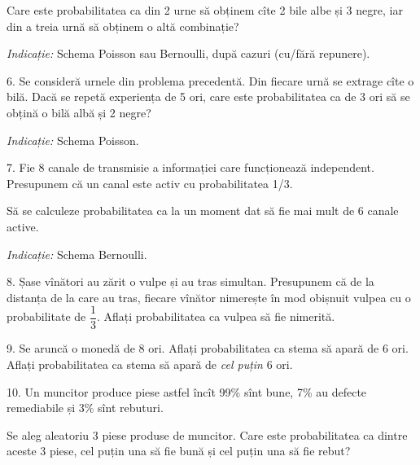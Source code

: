 Care este probabilitatea ca din 2 urne să obținem cîte 2 bile albe și 3 negre,
iar din a treia urnă să obținem o altă combinație?

\emph{Indicație:} Schema Poisson sau Bernoulli, după cazuri (cu/fără repunere).

\vspace{0.3cm}

6. Se consideră urnele din problema precedentă. Din fiecare urnă se extrage
cîte o bilă. Dacă se repetă experiența de 5 ori, care este probabilitatea ca
de 3 ori să se obțină o bilă albă și 2 negre?

\emph{Indicație:} Schema Poisson.

\vspace{0.3cm}

7. Fie 8 canale de transmisie a informației care funcționează independent.
Presupunem că un canal este activ cu probabilitatea 1/3.

Să se calculeze probabilitatea ca la un moment dat să fie mai mult de 6 canale
active.

\emph{Indicație:} Schema Bernoulli.

\vspace{0.3cm}

8. Șase vînători au zărit o vulpe și au tras simultan. Presupunem că de la
distanța de la care au tras, fiecare vînător nimerește în mod obișnuit vulpea
cu o probabilitate de $ \dfrac{1}{3} $. Aflați probabilitatea ca vulpea să
fie nimerită.

\vspace{0.3cm}

9. Se aruncă o monedă de 8 ori. Aflați probabilitatea ca stema să apară
de 6 ori. Aflați probabilitatea ca stema să apară de \emph{cel puțin} 6 ori.

\vspace{0.3cm}

10. Un muncitor produce piese astfel încît 99\% sînt bune, 7\% au defecte
remediabile și 3\% sînt rebuturi.

Se aleg aleatoriu 3 piese produse de muncitor. Care este probabilitatea
ca dintre aceste 3 piese, cel puțin una să fie bună și cel puțin una să fie
rebut?


